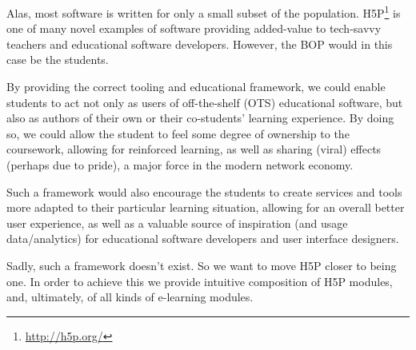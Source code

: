 Alas, most software is written for only a small subset of the population. 
H5P\footnote{\url{http://h5p.org/}} is one of many novel examples of software 
providing added-value to tech-savvy teachers and educational software 
developers. However, the BOP would in this case be the students.

By providing the correct tooling and educational framework, we could enable 
students to act not only as users of off-the-shelf (OTS) educational software, 
but also as authors of their own or their co-students' learning experience. By
doing so, we could allow the student to feel some degree of ownership to the
coursework, allowing for reinforced learning, as well as sharing (viral) 
effects (perhaps due to pride), a major force in the modern network economy.

Such a framework would also encourage the students to create services and tools
more adapted to their particular learning situation, allowing for an overall
better user experience, as well as a valuable source of inspiration (and usage
data/analytics) for educational software developers and user interface
designers.

Sadly, such a framework doesn't exist. So we want to move H5P closer to being 
one. In order to achieve this we provide intuitive composition of H5P modules, 
and, ultimately, of all kinds of e-learning modules.
